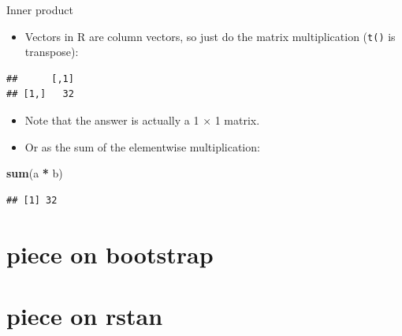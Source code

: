 \documentclass[ignorenonframetext,]{beamer}
\newenvironment{Shaded}{\begin{snugshade}}{\end{snugshade}}
\newcommand{\DecValTok}[1]{\textcolor[rgb]{0.00,0.00,0.81}{#1}}
\newcommand{\KeywordTok}[1]{\textcolor[rgb]{0.13,0.29,0.53}{\textbf{#1}}}
\newcommand{\NormalTok}[1]{#1}
\newcommand{\OperatorTok}[1]{\textcolor[rgb]{0.81,0.36,0.00}{\textbf{#1}}}
\newcommand{\StringTok}[1]{\textcolor[rgb]{0.31,0.60,0.02}{#1}}
\providecommand{\tightlist}{%
  \setlength{\itemsep}{0pt}\setlength{\parskip}{0pt}}
\begin{document}
\begin{frame}[fragile]{Inner product}
\protect\hypertarget{inner-product}{}

\begin{itemize}
\tightlist
\item
  Vectors in R are column vectors, so just do the matrix multiplication
  (\texttt{t()} is transpose):
\end{itemize}

\begin{Shaded}
\end{Shaded}

\begin{verbatim}
##      [,1]
## [1,]   32
\end{verbatim}

\begin{itemize}
\tightlist
\item
  Note that the answer is actually a 1 × 1 matrix.
\item
  Or as the sum of the elementwise multiplication:
\end{itemize}

\begin{Shaded}
\begin{Highlighting}[]
\KeywordTok{sum}\NormalTok{(a }\OperatorTok{*}\StringTok{ }\NormalTok{b)}
\end{Highlighting}
\end{Shaded}

\begin{verbatim}
## [1] 32
\end{verbatim}

\end{frame}

\hypertarget{piece-on-bootstrap}{%
\section{piece on bootstrap}\label{piece-on-bootstrap}}

\hypertarget{piece-on-rstan}{%
\section{piece on rstan}\label{piece-on-rstan}}
\end{document}
